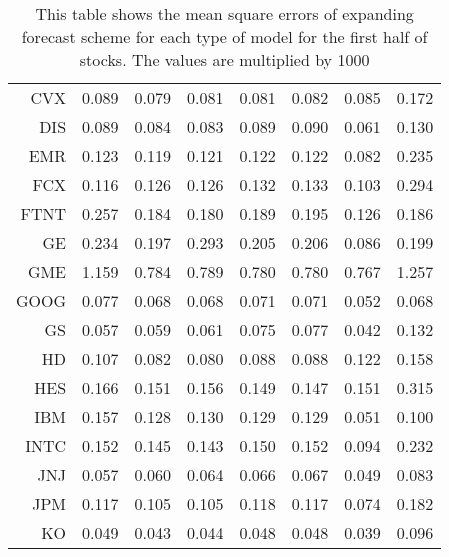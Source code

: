 \begin{table}[ht]
\begin{tabular}{rrrrrrrr}
  CVX & 0.089 & 0.079 & 0.081 & 0.081 & 0.082 & 0.085 & 0.172 \\ 
  DIS & 0.089 & 0.084 & 0.083 & 0.089 & 0.090 & 0.061 & 0.130 \\ 
  EMR & 0.123 & 0.119 & 0.121 & 0.122 & 0.122 & 0.082 & 0.235 \\ 
  FCX & 0.116 & 0.126 & 0.126 & 0.132 & 0.133 & 0.103 & 0.294 \\ 
  FTNT & 0.257 & 0.184 & 0.180 & 0.189 & 0.195 & 0.126 & 0.186 \\ 
  GE & 0.234 & 0.197 & 0.293 & 0.205 & 0.206 & 0.086 & 0.199 \\ 
  GME & 1.159 & 0.784 & 0.789 & 0.780 & 0.780 & 0.767 & 1.257 \\ 
  GOOG & 0.077 & 0.068 & 0.068 & 0.071 & 0.071 & 0.052 & 0.068 \\ 
  GS & 0.057 & 0.059 & 0.061 & 0.075 & 0.077 & 0.042 & 0.132 \\ 
  HD & 0.107 & 0.082 & 0.080 & 0.088 & 0.088 & 0.122 & 0.158 \\ 
  HES & 0.166 & 0.151 & 0.156 & 0.149 & 0.147 & 0.151 & 0.315 \\ 
  IBM & 0.157 & 0.128 & 0.130 & 0.129 & 0.129 & 0.051 & 0.100 \\ 
  INTC & 0.152 & 0.145 & 0.143 & 0.150 & 0.152 & 0.094 & 0.232 \\ 
  JNJ & 0.057 & 0.060 & 0.064 & 0.066 & 0.067 & 0.049 & 0.083 \\ 
  JPM & 0.117 & 0.105 & 0.105 & 0.118 & 0.117 & 0.074 & 0.182 \\ 
  KO & 0.049 & 0.043 & 0.044 & 0.048 & 0.048 & 0.039 & 0.096 \\ 
   \hline
\end{tabular}
\caption[MSE expanding forecast (1)]{This table shows the mean square errors of expanding forecast scheme for each type of model for the first half of stocks. 
                     The values are multiplied by 1000} 
\label{Table:MSE_e_1}
\end{table}
